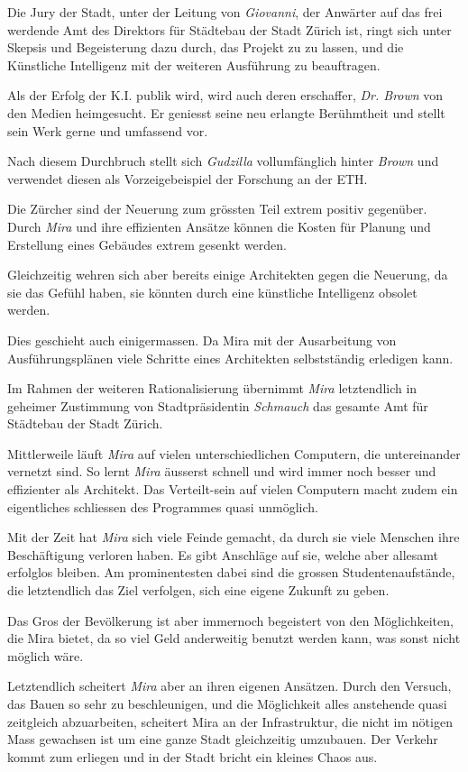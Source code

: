 \documentclass[11pt,a4paper,ngerman]{scrreprt}
\begin{document}
Die Jury der Stadt, unter der Leitung von \emph{Giovanni}, der Anwärter auf das
frei werdende Amt des Direktors für Städtebau der Stadt Zürich ist, ringt
sich unter Skepsis und Begeisterung dazu durch, das Projekt zu zu lassen, und
die Künstliche Intelligenz mit der weiteren Ausführung zu beauftragen.

Als der Erfolg der K.I. publik wird, wird auch deren erschaffer, \emph{Dr. Brown}
von den Medien heimgesucht. Er geniesst seine neu erlangte Berühmtheit und
stellt sein Werk gerne und umfassend vor.

Nach diesem Durchbruch stellt sich \emph{Gudzilla} vollumfänglich hinter \emph{Brown}
und verwendet diesen als Vorzeigebeispiel der Forschung an der ETH.

Die Zürcher sind der Neuerung zum grössten Teil extrem positiv
gegenüber. Durch \emph{Mira} und ihre effizienten Ansätze können die Kosten für
Planung und Erstellung eines Gebäudes extrem gesenkt werden.

Gleichzeitig wehren sich aber bereits einige Architekten gegen die Neuerung,
da sie das Gefühl haben, sie könnten durch eine künstliche Intelligenz
obsolet werden.

Dies geschieht auch einigermassen. Da Mira mit der Ausarbeitung von
Ausführungsplänen viele Schritte eines Architekten selbstständig erledigen
kann.

Im Rahmen der weiteren Rationalisierung übernimmt \emph{Mira} letztendlich in
geheimer Zustimmung von Stadtpräsidentin \emph{Schmauch} das gesamte Amt für
Städtebau der Stadt Zürich.

Mittlerweile läuft \emph{Mira} auf vielen unterschiedlichen Computern, die
untereinander vernetzt sind. So lernt \emph{Mira} äusserst schnell und wird immer
noch besser und effizienter als Architekt. Das Verteilt-sein auf vielen
Computern macht zudem ein eigentliches schliessen des Programmes quasi
unmöglich.

Mit der Zeit hat \emph{Mira} sich viele Feinde gemacht, da durch sie viele
Menschen ihre Beschäftigung verloren haben. Es gibt Anschläge auf sie, welche
aber allesamt erfolglos bleiben. Am prominentesten dabei sind die grossen
Studentenaufstände, die letztendlich das Ziel verfolgen, sich eine eigene
Zukunft zu geben.

Das Gros der Bevölkerung ist aber immernoch begeistert von den Möglichkeiten,
die Mira bietet, da so viel Geld anderweitig benutzt werden kann, was sonst
nicht möglich wäre.

Letztendlich scheitert \emph{Mira} aber an ihren eigenen Ansätzen. Durch den
Versuch, das Bauen so sehr zu beschleunigen, und die Möglichkeit alles
anstehende quasi zeitgleich abzuarbeiten, scheitert Mira an der
Infrastruktur, die nicht im nötigen Mass gewachsen ist um eine ganze Stadt
gleichzeitig umzubauen. Der Verkehr kommt zum erliegen und in der Stadt
bricht ein kleines Chaos aus.
\end{document}
